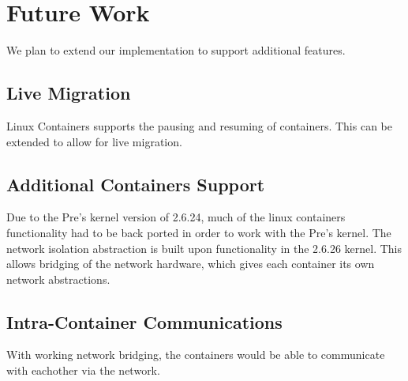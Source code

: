 \section{Future Work}
We plan to extend our implementation to support additional features.  
\subsection{Live Migration}
Linux Containers supports the pausing and resuming of containers.  This can be extended to allow for live migration.

\subsection{Additional Containers Support}
Due to the Pre's kernel version of 2.6.24, much of the linux containers functionality had to be back ported in order to work with the Pre's kernel.  The network isolation abstraction is built upon functionality in the 2.6.26 kernel.  This allows bridging of the network hardware, which gives each container its own network abstractions. \\

\subsection{Intra-Container Communications}
With working network bridging, the containers would be able to communicate with eachother via the network. \\

